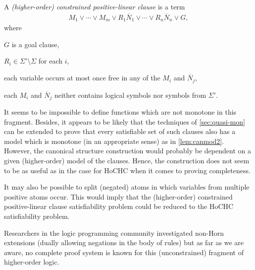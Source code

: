\documentclass[a4paper,twoside,notitlepage,openright,11pt]{report}
\begin{document}
\begin{definition}
  A \emph{(higher-order) constrained positive-linear clause} is a term
  \begin{align*}
    M_1\lor\cdots\lor M_m\lor R_1\overline N_1\lor\cdots\lor R_n\overline N_n\lor G,
  \end{align*}
  where
\begin{thmlist}
\item $G$ is a goal clause,
\item $R_i\in\Sigma'\setminus\Sigma$ for each $i$,
\item each variable occurs at most once free in any of the $M_i$ and $\overline N_j$,
\item each $M_i$ and $\overline N_j$ neither contains logical symbols nor symbols from $\Sigma'$.
\end{thmlist}
\end{definition}

It seems to be impossible to define functions which are not monotone in this fragment. Besides, it appears to be likely that the techniques of \cref{sec:quasi-mon} can be extended to prove that every satisfiable set of such clauses also has a model which is monotone (in an appropriate sense) as in \cref{lem:canmod2}. However, the canonical structure construction would probably be dependent on a given (higher-order) model of the clauses. Hence, the construction does not seem to be as useful as in the case for HoCHC when it comes to proving completeness.

It may also be possible to split (negated) atoms in which variables from multiple positive atoms occur. This would imply that the (higher-order) constrained positive-linear clause satisfiability problem could be reduced to the HoCHC satisfiability problem.

Researchers in the logic programming community investigated non-Horn extensions (dually allowing negations in the body of rules) \cite{CER14,CR14} but as far as we are aware, no complete proof system is known for this (unconstrained) fragment of higher-order logic.
\end{document}
